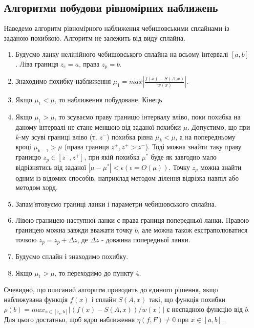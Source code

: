 \documentclass[ukrainian,14pt]{extarticle}
\begin{document}
\subsection{Алгоритми побудови рівномірних наближень}

Наведемо алгоритм рівномірного наближення чебишовськими сплайнами із заданою похибкою. Алгоритм не залежить від виду сплайна.
\begin{enumerate}

\item Будуємо ланку нелінійного чебишовського сплайна на всьому інтервалі $[a,b]$. Ліва границя $z_e = a$, права $z_p = b$.
\item Знаходимо похибку наближення $\mu_1 = max \left|\frac{f(x) - S(A, x)}{w(x)}\right|.$
\item Якщо $\mu_1 < \mu$, то наближення побудоване. Кінець
\item Якщо $\mu_1 > \mu$, то зсуваємо праву границю інтервалу вліво, поки похибка на даному інтервалі не стане меншою від заданої похибки $\mu$. Допустимо, що при $k$-му зсуві границі вліво (т. $z^-$) похибка рівна $\mu_k < \mu$, а на попередньому кроці $\mu_{k-1} > \mu$ (права границя $z^+, z^+ > z^-$). Тоді можна знайти таку праву границю $z_p \in [z^-, z^+]$, при якій похибка $\mu^*$ буде як завгодно мало відрізнятись від заданої $|\mu - \mu^*| < \epsilon (\epsilon = O(\mu)).$ Точку $z_p$ можна знайти одним із відомих способів, наприклад методом ділення відрізка навпіл або методом хорд.
\item Запам'ятовуємо границі ланки і параметри чебишовського сплайна.
\item Лівою границею наступної ланки є права границя попередньої ланки. Правою границею можна завжди вважати точку $b$, але можна також екстраполюватися точкою $z_p = z_p + \Delta z$, де $\Delta z$ - довжина попередньої ланки.
\item Будуємо сплайн і знаходимо похибку.
\item Якщо $\mu_1 > \mu$, то переходимо до пункту 4.
%
\end{enumerate}

Очевидно, що описаний алгоритм приводить до єдиного рішення, якщо наближувана функція $f(x)$ і сплайн $S(A, x)$ такі, що функція похибки $\rho(b) = max_{x \in [z_e, b]} |(f(x) - S(A, x))/w(x)|$ є неспадною функцію від $b$. Для цього достатньо, щоб ядро наближення $\eta(f, F) \neq 0$ при $x \in [a, b]$.
\end{document}
